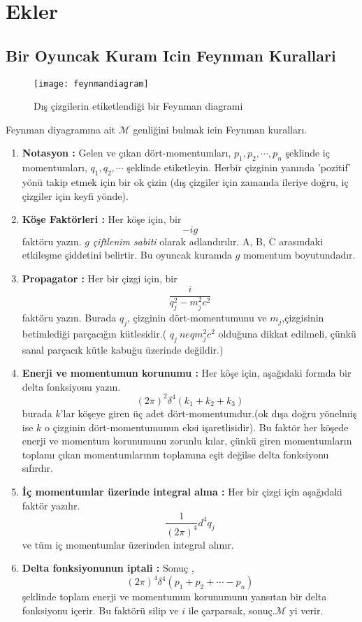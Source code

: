 \chapter{Ekler}
\section{Bir Oyuncak Kuram Icin Feynman Kurallari}
\begin{center}
\begin{figure}[!ph]
\texttt{[image: feynmandiagram]}
\caption{Dış çizgilerin etiketlendiği bir Feynman diagrami}
\end{figure}
\end{center}
Feynman diyagramına ait $\mathscr{M}$ genliğini bulmak icin Feynman kuralları.
\begin{enumerate}
\item \textbf{Notasyon :} Gelen ve çıkan dört-momentumları, $p_1,p_2,\cdots,p_n$ şeklinde iç momentumları, $q_1,q_2,\cdots$ şeklinde etiketleyin. Herbir çizginin yanında 'pozitif' yönü takip etmek için bir ok çizin (dış çizgiler için zamanda ileriye doğru, iç çizgiler için keyfi yönde).
\item \textbf{Köşe Faktörleri :} Her köşe için, bir
\begin{equation}
-ig
\end{equation}
faktöru yazın. $g$ \textit{çiftlenim sabiti} olarak adlandırılır. A, B, C arasındaki etkileşme şiddetini belirtir. Bu oyuncak kuramda $g$ momentum boyutundadır.
\item \textbf{Propagator :} Her bir çizgi için, bir
\begin{equation}
\frac{i}{q_j^2-m_j^2c^2}
\end{equation}
faktöru yazın. Burada $q_j$, çizginin dört-momentumunu ve $m_j$,çizgisinin betimlediği parçacığın kütlesidir.( $q_j\ neq  m_j^2c^2$ olduğuna dikkat edilmeli, çünkü sanal parçacık kütle kabuğu üzerinde değildir.)
\item \textbf{Enerji ve momentumun korunumu : } Her köşe için, aşağıdaki formda bir delta fonksiyonu yazın.
\begin{equation}
(2 \pi)^2 \delta^4(k_1+k_2+k_3)
\end{equation}
burada $k$'lar köşeye giren üç adet dört-momentumdur.(ok dışa doğru yönelmiş ise $k$ o çizginin dört-momentumunun eksi işaretlisidir). Bu faktör her köşede enerji ve momentum korunumunu zorunlu kılar, çünkü giren momentumların toplamı çıkan momentumlarının toplamına eşit değilse delta fonksiyonu sıfırdır.
\item \textbf{İç momentumlar üzerinde integral alma :} Her bir çizgi için aşağıdaki faktör yazılır.
\begin{equation}
\frac{1}{(2\pi)^4}d^4q_j
\end{equation}
ve tüm iç momentumlar üzerinden integral alınır.
\item \textbf{Delta fonksiyonunun iptali : } Sonuç ,
\begin{equation}
(2\pi)^4 \delta^4(p_1 +p_2+\cdots -p_n)
\end{equation}
şeklinde toplam enerji ve momentumun korunumunu yansıtan bir delta fonksiyonu içerir. Bu faktörü silip ve $i$ ile çarparsak,  sonuç.$\mathscr{M}$ yi verir.
\end{enumerate}
